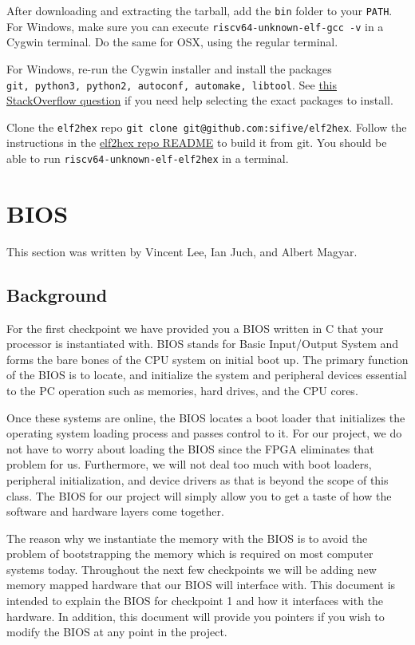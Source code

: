 \documentclass[11pt]{article}
\begin{document}
After downloading and extracting the tarball, add the \verb|bin| folder to your \verb|PATH|.
For Windows, make sure you can execute \verb|riscv64-unknown-elf-gcc -v| in a Cygwin terminal.
Do the same for OSX, using the regular terminal.

For Windows, re-run the Cygwin installer and install the packages\\\verb|git, python3, python2, autoconf, automake, libtool|.
See \href{https://stackoverflow.com/questions/47168311/cygwin-and-failed-to-run-aclocal-no-such-file-or-directory}{this StackOverflow question} if you need help selecting the exact packages to install.

Clone the \verb|elf2hex| repo \verb|git clone git@github.com:sifive/elf2hex|.
Follow the instructions in the \href{https://github.com/sifive/elf2hex}{elf2hex repo README} to build it from git.
You should be able to run \verb|riscv64-unknown-elf-elf2hex| in a terminal.

\section{BIOS}
\label{sec:biosinfo}
This section was written by Vincent Lee, Ian Juch, and Albert Magyar.

\subsection{Background}
For the first checkpoint we have provided you a BIOS written in C that your processor is
instantiated with. BIOS stands for Basic Input/Output System and forms the bare bones of the
CPU system on initial boot up. The primary function of the BIOS is to locate, and initialize the
system and peripheral devices essential to the PC operation such as memories, hard drives, and
the CPU cores.

Once these systems are online, the BIOS locates a boot loader that initializes the operating
system loading process and passes control to it. For our project, we do not have to worry about
loading the BIOS since the FPGA eliminates that problem for us. Furthermore, we will not deal
too much with boot loaders, peripheral initialization, and device drivers as that is beyond the
scope of this class. The BIOS for our project will simply allow you to get a taste of how the
software and hardware layers come together.

The reason why we instantiate the memory with the BIOS is to avoid the problem of
bootstrapping the memory which is required on most computer systems today. Throughout the
next few checkpoints we will be adding new memory mapped hardware that our BIOS will
interface with. This document is intended to explain the BIOS for checkpoint 1 and how it
interfaces with the hardware. In addition, this document will provide you pointers if you wish to
modify the BIOS at any point in the project.
\end{document}
